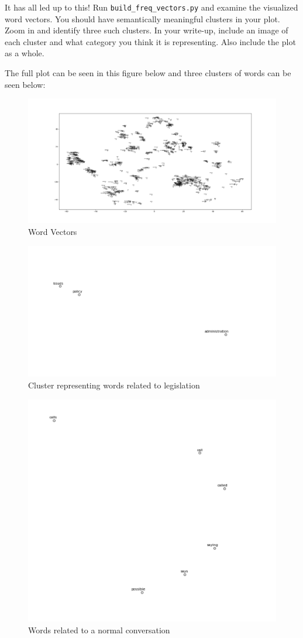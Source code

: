 \documentclass[a4paper,10pt]{article}
\begin{document}
\vspace{5pt}
\begin{taskbox}
 It has all led up to this! Run \texttt{build\_freq\_vectors.py} and examine the visualized word vectors. You should have semantically meaningful clusters in your plot. Zoom in and identify three such clusters. In your write-up, include an image of each cluster and what category you think it is representing. Also include the plot as a whole.
\end{taskbox}
\begin{answerbox}
    The full plot can be seen in this figure below and three clusters of words can be seen below:
\end{answerbox}
    \begin{figure}[H]
        \centering
        \includegraphics[width=0.5\linewidth]{build_freq.png}
        \caption{Word Vectors}
        \label{fig:enter-label}
    \end{figure}
\begin{figure}[H]
    \centering
    \includegraphics[width=0.5\linewidth]{legislation.png}
    \caption{Cluster representing words related to legislation}
    \label{fig:enter-label}
\end{figure}
\begin{figure}[H]
    \centering
    \includegraphics[width=0.5\linewidth]{conversation.png}
    \caption{Words related to a normal conversation}
    \label{fig:enter-label}
\end{figure}
\end{document}
